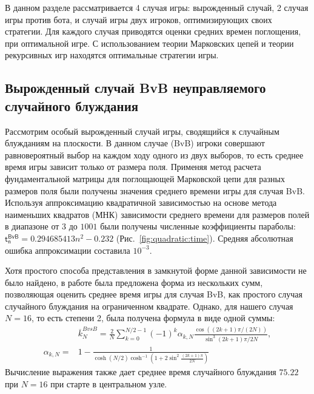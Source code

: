 В данном разделе рассматривается 4 случая игры: вырожденный случай, 2 случая игры против бота, и случай игры двух игроков, оптимизирующих своих стратегии. Для каждого случая приводятся оценки средних времен поглощения, при оптимальной игре. С использованием теории Марковских цепей и теории рекурсивных игр находятся оптимальные стратегии игры.

\subsection{Вырожденный случай BvB неуправляемого случайного блуждания}\label{subsec:ch3/sec3/sub1}

Рассмотрим особый вырожденный случай игры, сводящийся к случайным блужданиям на плоскости. В данном случае (BvB) игроки совершают равновероятный выбор на каждом ходу одного из двух выборов, то есть среднее время игры зависит только от размера поля. Применяя метод расчета фундаментальной матрицы для поглощающей Марковской цепи для разных размеров поля были получены значения среднего времени игры для случая BvB. Используя аппроксимацию квадратичной зависимостью на основе метода наименьших квадратов (МНК) зависимости среднего времени для размеров полей в диапазоне от $3$ до $1001$
были получены численные коэффициенты параболы: $\boldsymbol{\mathsf{t_n^{BvB}}} = 0.294685413 n^2 - 0.232$ (Рис.~\cref{fig:quadratic:time}). Средняя абсолютная ошибка аппроксимации составила $10^{-3}$. 

Хотя простого способа представления в замкнутой форме данной зависимости  не было найдено, в работе \cite{kmet_gamblers_2002} была предложена форма из нескольких сумм, позволяющая оценить
среднее время игры для случая BvB, как простого случая случайного блуждания на ограниченном квадрате. Однако, для нашего случая $N=16$, то есть степени 2, была получена формула в виде одной суммы:
\begin{equation}
	\begin{aligned}
		& \overline{k}_N^{B vs B} = \frac{2}{N} \sum_{k=0}^{N/2-1} (-1)^k \alpha_{k,N} 
		\frac{\cos((2k+1)\pi/(2N))}{\sin^3{(2k+1)\pi/2N}}, \\
		\alpha_{k,N} =& 1-\frac{1}{\cosh(N/2)\cosh^{-1}\left(1+2\sin^2\frac{(2k+1)\pi}{2N}\right)}
		\label{eq:absorption_bvb_center}
	\end{aligned}
\end{equation}
Вычисление выражения также дает среднее время случайного блуждания $75.22$ при $N=16$ при старте в центральном узле.

